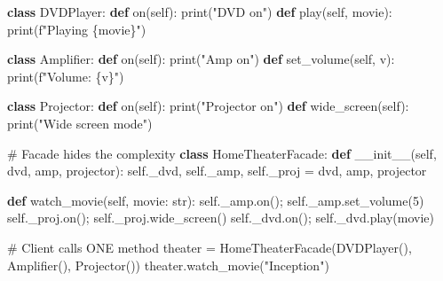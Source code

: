 \documentclass[11pt]{article}
\newenvironment{Shaded}{\begin{snugshade}}{\end{snugshade}}
\newcommand{\BuiltInTok}[1]{\textcolor[rgb]{0.50,0.55,0.55}{#1}}
\newcommand{\CommentTok}[1]{\textcolor[rgb]{0.48,0.49,0.49}{#1}}
\newcommand{\DecValTok}[1]{\textcolor[rgb]{0.96,0.45,0.00}{#1}}
\newcommand{\FunctionTok}[1]{\textcolor[rgb]{0.56,0.27,0.68}{#1}}
\newcommand{\KeywordTok}[1]{\textcolor[rgb]{0.81,0.81,0.76}{\textbf{#1}}}
\newcommand{\NormalTok}[1]{\textcolor[rgb]{0.81,0.81,0.76}{#1}}
\newcommand{\OperatorTok}[1]{\textcolor[rgb]{0.81,0.81,0.76}{#1}}
\newcommand{\SpecialCharTok}[1]{\textcolor[rgb]{0.24,0.68,0.91}{#1}}
\newcommand{\SpecialStringTok}[1]{\textcolor[rgb]{0.85,0.27,0.33}{#1}}
\newcommand{\StringTok}[1]{\textcolor[rgb]{0.96,0.31,0.31}{#1}}
\newcommand{\VariableTok}[1]{\textcolor[rgb]{0.15,0.68,0.68}{#1}}
\begin{document}
\begin{Shaded}
\begin{Highlighting}[]
\KeywordTok{class}\NormalTok{ DVDPlayer:}
    \KeywordTok{def}\NormalTok{ on(}\VariableTok{self}\NormalTok{): }\BuiltInTok{print}\NormalTok{(}\StringTok{"DVD on"}\NormalTok{)}
    \KeywordTok{def}\NormalTok{ play(}\VariableTok{self}\NormalTok{, movie): }\BuiltInTok{print}\NormalTok{(}\SpecialStringTok{f"Playing }\SpecialCharTok{\{}\NormalTok{movie}\SpecialCharTok{\}}\SpecialStringTok{"}\NormalTok{)}

\KeywordTok{class}\NormalTok{ Amplifier:}
    \KeywordTok{def}\NormalTok{ on(}\VariableTok{self}\NormalTok{): }\BuiltInTok{print}\NormalTok{(}\StringTok{"Amp on"}\NormalTok{)}
    \KeywordTok{def}\NormalTok{ set\_volume(}\VariableTok{self}\NormalTok{, v): }\BuiltInTok{print}\NormalTok{(}\SpecialStringTok{f"Volume: }\SpecialCharTok{\{}\NormalTok{v}\SpecialCharTok{\}}\SpecialStringTok{"}\NormalTok{)}

\KeywordTok{class}\NormalTok{ Projector:}
    \KeywordTok{def}\NormalTok{ on(}\VariableTok{self}\NormalTok{): }\BuiltInTok{print}\NormalTok{(}\StringTok{"Projector on"}\NormalTok{)}
    \KeywordTok{def}\NormalTok{ wide\_screen(}\VariableTok{self}\NormalTok{): }\BuiltInTok{print}\NormalTok{(}\StringTok{"Wide screen mode"}\NormalTok{)}

\CommentTok{\# Facade hides the complexity}
\KeywordTok{class}\NormalTok{ HomeTheaterFacade:}
    \KeywordTok{def} \FunctionTok{\_\_init\_\_}\NormalTok{(}\VariableTok{self}\NormalTok{, dvd, amp, projector):}
        \VariableTok{self}\NormalTok{.\_dvd, }\VariableTok{self}\NormalTok{.\_amp, }\VariableTok{self}\NormalTok{.\_proj }\OperatorTok{=}\NormalTok{ dvd, amp, projector}

    \KeywordTok{def}\NormalTok{ watch\_movie(}\VariableTok{self}\NormalTok{, movie: }\BuiltInTok{str}\NormalTok{):}
        \VariableTok{self}\NormalTok{.\_amp.on()}\OperatorTok{;} \VariableTok{self}\NormalTok{.\_amp.set\_volume(}\DecValTok{5}\NormalTok{)}
        \VariableTok{self}\NormalTok{.\_proj.on()}\OperatorTok{;} \VariableTok{self}\NormalTok{.\_proj.wide\_screen()}
        \VariableTok{self}\NormalTok{.\_dvd.on()}\OperatorTok{;} \VariableTok{self}\NormalTok{.\_dvd.play(movie)}

\CommentTok{\# Client calls ONE method}
\NormalTok{theater }\OperatorTok{=}\NormalTok{ HomeTheaterFacade(DVDPlayer(), Amplifier(), Projector())}
\NormalTok{theater.watch\_movie(}\StringTok{"Inception"}\NormalTok{)}
\end{Highlighting}
\end{Shaded}
\end{document}
